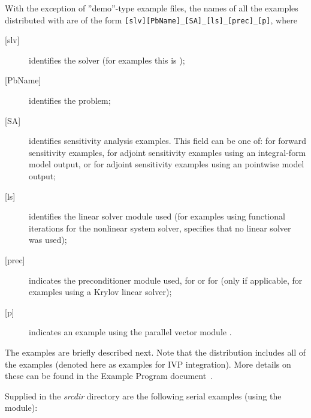 \vspace{0.2in}\noindent
With the exception of ''demo''-type example files, the names of all the examples 
distributed with {\sundials} are of the form \verb![slv][PbName]_[SA]_[ls]_[prec]_[p]!, 
where
\begin{description}
\item [{[slv]}] identifies the solver (for {\cvodes} examples this is );
\item [{[PbName]}] identifies the problem;
\item [{[SA]}] identifies sensitivity analysis examples. This field can be one
  of:  for forward sensitivity examples,  for adjoint sensitivity
  examples using an integral-form model output, or  for adjoint sensitivity
  examples using an pointwise model output;
\item [{[ls]}] identifies the linear solver module used (for examples using
  functional iterations for the nonlinear system solver,  specifies
  that no linear solver was used);
\item [{[prec]}] indicates the {\cvodes} preconditioner module used, 
   for {\cvbandpre} or  for {\cvbbdpre} 
  (only if applicable, for examples using a Krylov linear solver);
\item [{[p]}] indicates an example using the parallel vector module {\nvecp}.
\end{description}

\vspace{0.2in}\noindent
The examples are briefly described next.
Note that the {\cvodes} distribution includes all of the {\cvode} {\C}
examples (denoted here as examples for IVP integration). More details on
these can be found in the {\cvode} Example Program document~\cite{cvode_ex}.


\vspace{0.2in}\noindent
Supplied in the {\em srcdir} directory are the
following serial examples (using the {\nvecs} module):

